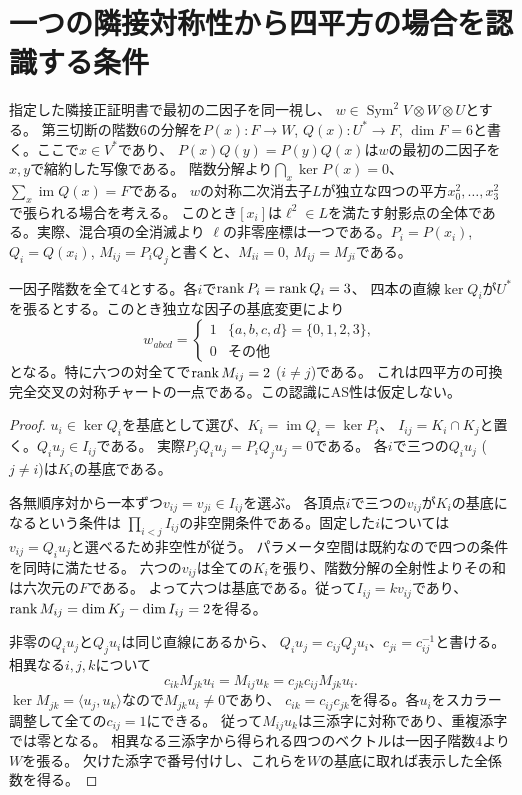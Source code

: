 \section{一つの隣接対称性から四平方の場合を認識する条件}
\label{sec:adjacent-four-squares}
指定した隣接正証明書で最初の二因子を同一視し、
$w\in\operatorname{Sym}^2 V\otimes W\otimes U$とする。
第三切断の階数6の分解を$P(x):F\to W$, $Q(x):U^*\to F$,
$\dim F=6$と書く。ここで$x\in V^*$であり、
$P(x)Q(y)=P(y)Q(x)$は$w$の最初の二因子を$x,y$で縮約した写像である。
階数分解より$\bigcap_x\ker P(x)=0$、$\sum_x\operatorname{im}Q(x)=F$である。
$w$の対称二次消去子$L$が独立な四つの平方$x_0^2,\ldots,x_3^2$で張られる場合を考える。
このとき$[x_i]$は$\ell^2\in L$を満たす射影点の全体である。実際、混合項の全消滅より
$\ell$の非零座標は一つである。$P_i=P(x_i)$, $Q_i=Q(x_i)$,
$M_{ij}=P_iQ_j$と書くと、$M_{ii}=0$, $M_{ij}=M_{ji}$である。


\begin{proposition}[四本の核直線による対称認識]\label{prop:square-kernel-recognition}
一因子階数を全て4とする。各$i$で$\operatorname{rank} P_i=\operatorname{rank} Q_i=3$、
四本の直線$\ker Q_i$が$U^*$を張るとする。このとき独立な因子の基底変更により
\[
 w_{abcd}=\begin{cases}1&\{a,b,c,d\}=\{0,1,2,3\},\\0&\text{その他}\end{cases}
\]
となる。特に六つの対全てで$\operatorname{rank} M_{ij}=2$ ($i\ne j$)である。
これは四平方の可換完全交叉の対称チャートの一点である。この認識にAS性は仮定しない。
\end{proposition}
\begin{proof}
$u_i\in\ker Q_i$を基底として選び、$K_i=\operatorname{im}Q_i=\ker P_i$、
$I_{ij}=K_i\cap K_j$と置く。$Q_i u_j\in I_{ij}$である。
実際$P_jQ_i u_j=P_iQ_j u_j=0$である。
各$i$で三つの$Q_i u_j$ ($j\ne i$)は$K_i$の基底である。

各無順序対から一本ずつ$v_{ij}=v_{ji}\in I_{ij}$を選ぶ。
各頂点$i$で三つの$v_{ij}$が$K_i$の基底になるという条件は
$\prod_{i<j}I_{ij}$の非空開条件である。固定した$i$については
$v_{ij}=Q_i u_j$と選べるため非空性が従う。
パラメータ空間は既約なので四つの条件を同時に満たせる。
六つの$v_{ij}$は全ての$K_i$を張り、階数分解の全射性よりその和は六次元の$F$である。
よって六つは基底である。従って$I_{ij}=k v_{ij}$であり、
$\operatorname{rank} M_{ij}=\dim K_j-\dim I_{ij}=2$を得る。

非零の$Q_i u_j$と$Q_j u_i$は同じ直線にあるから、
$Q_i u_j=c_{ij}Q_j u_i$、$c_{ji}=c_{ij}^{-1}$と書ける。
相異なる$i,j,k$について
\[
 c_{ik}M_{jk}u_i=M_{ij}u_k=c_{jk}c_{ij}M_{jk}u_i.
\]
$\ker M_{jk}=\langle u_j,u_k\rangle$なので$M_{jk}u_i\ne0$であり、
$c_{ik}=c_{ij}c_{jk}$を得る。各$u_i$をスカラー調整して全ての$c_{ij}=1$にできる。
従って$M_{ij}u_k$は三添字に対称であり、重複添字では零となる。
相異なる三添字から得られる四つのベクトルは一因子階数4より$W$を張る。
欠けた添字で番号付けし、これらを$W$の基底に取れば表示した全係数を得る。
\end{proof}

